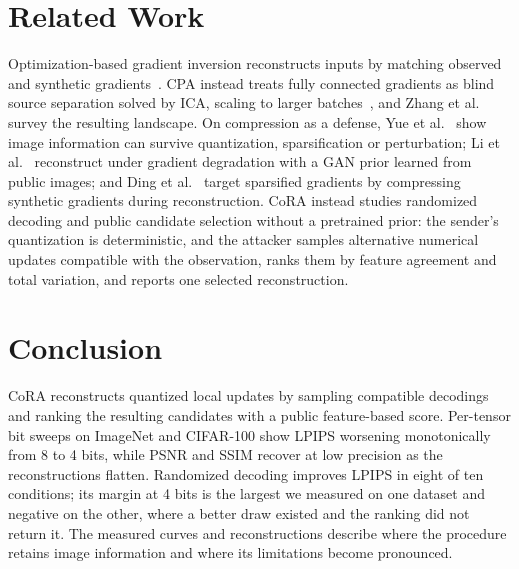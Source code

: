 \documentclass{article}
\newcommand{\cora}{CoRA}
\begin{document}
\section{Related Work}
\label{sec:related}
Optimization-based gradient inversion reconstructs inputs by matching observed
and synthetic gradients~\cite{zhu2019deep,geiping2020inverting}. CPA instead
treats fully connected gradients as blind source separation solved by ICA,
scaling to larger batches~\cite{kariyappa2023cocktail}, and Zhang et
al.~\cite{zhang2022survey} survey the resulting landscape. On compression as a
defense, Yue et al.~\cite{yue2023gradient} show image information can survive
quantization, sparsification or perturbation; Li et al.~\cite{li2022ggl}
reconstruct under gradient degradation with a GAN prior learned from public
images; and Ding et al.~\cite{ding2024compressed} target sparsified gradients
by compressing synthetic gradients during reconstruction. \cora{} instead
studies randomized decoding and public candidate selection without a
pretrained prior: the sender's quantization is deterministic, and the attacker
samples alternative numerical updates compatible with the observation, ranks
them by feature agreement and total variation, and reports one selected
reconstruction.


\section{Conclusion}
\cora{} reconstructs quantized local updates by sampling compatible decodings
and ranking the resulting candidates with a public feature-based score.
Per-tensor bit sweeps on ImageNet and CIFAR-100 show LPIPS worsening
monotonically from 8 to 4 bits, while PSNR and SSIM recover at low precision
as the reconstructions flatten. Randomized decoding improves LPIPS in eight of
ten conditions; its margin at 4 bits is the largest we measured on one dataset
and negative on the other, where a better draw existed and the ranking did not
return it. The measured curves and reconstructions describe where the
procedure retains image information and where its limitations become
pronounced.
\end{document}
